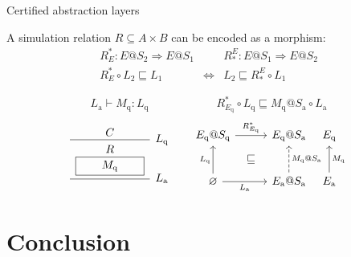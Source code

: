 \documentclass{beamer}
\newcommand{\kw}[1]{\ensuremath{ \mathrm{#1} }}
\begin{document}
\begin{frame}[fragile]{Certified abstraction layers} %
  \begin{definition}
    A simulation relation $R \subseteq A \times B$
    can be encoded as a morphism:
    \[
      \begin{array}{ccc}
        R^*_E : E@S_2 \Rightarrow E@S_1 & &
        R_*^E : E@S_1 \Rightarrow E@S_2 \\[1ex]
        R^*_E \circ L_2 \sqsubseteq L_1 &
        \Leftrightarrow &
        L_2 \sqsubseteq R_*^E \circ L_1
      \end{array}
    \]
  \end{definition}
  \pause
  \begin{example}
    \[
        L_\kw{a} \vdash M_\kw{q} : L_\kw{q} \qquad \qquad \qquad
        R^*_{E_\kw{q}} \circ L_\kw{q} \sqsubseteq
          M_\kw{q}@S_\kw{a} \circ L_\kw{a}
    \]
    \[
      \begin{prooftree}
        \hypo{C}
        \infer1[$L_\kw{q}$]{\begin{array}{c}R \\ \fbox{$\qquad M_\kw{q} \qquad$}\end{array}}
        \infer1[$L_\kw{a}$]{}
      \end{prooftree}
      \qquad
      \begin{tikzcd}[sep=tiny]
        E_\kw{q}@S_\kw{q} \ar[rr, "R^*_{E_\kw{q}}"] & &
        E_\kw{q}@S_\kw{a} & E_\kw{q} \\
        & \sqsubseteq & & \\
        \varnothing \ar[uu, "L_\kw{q}"] \ar[rr, "L_\kw{a}"'] & &
        E_\kw{a}@S_\kw{a} \ar[uu, "M_\kw{q}@S_\kw{a}"', dashed] &
        E_\kw{a} \ar[uu, "M_\kw{q}"']
      \end{tikzcd} 
    \]
  \end{example}
\end{frame}


\section*{Conclusion} %
\end{document}
